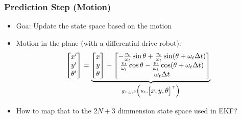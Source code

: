 \begin{frame}
    \frametitle{Prediction Step (Motion)}

    \begin{itemize}
        \item Goa: Update the state space based on the motion
        \item Motion in the plane (with a differential drive robot):
        \begin{equation*}
            \begin{bmatrix} x' \\ y' \\ \theta' \end{bmatrix} = 
            \underbrace{\begin{bmatrix} x \\ y \\ \theta \end{bmatrix} + 
            \begin{bmatrix} 
            -\frac{v_t}{\omega_t} \sin \theta + \frac{v_t}{\omega_t} \sin (\theta + \omega_t \Delta t) \\ 
            \frac{v_t}{\omega_t} \cos \theta - \frac{v_t}{\omega_t} \cos (\theta + \omega_t \Delta t) \\ 
            \omega_t \Delta t 
            \end{bmatrix}}_{g_{x,y,\theta}\left(u_{t}, \begin{bmatrix} x, y, \theta \end{bmatrix}^{\top}\right)}
        \end{equation*}
        \item How to map that to the $2N+3$ dimmension state space used in EKF?
    \end{itemize}

\end{frame}

